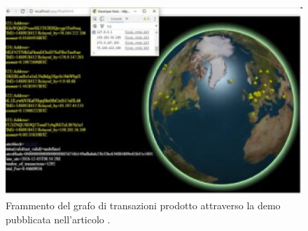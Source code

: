 \begin{figure}[H]
\centering
\includegraphics[scale=0.1]{images/vs_article.pdf}
\caption{Frammento del grafo di transazioni prodotto attraverso la demo pubblicata nell'articolo \cite{inproceedings}.\label{fig:bitcoinTransactionVis}}
\end{figure}
